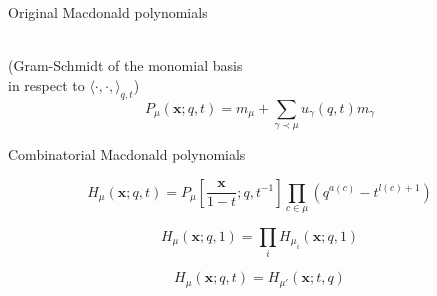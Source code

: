 \documentclass[12pt]{amsart}
\begin{document}
\vspace{-10pt}
\begin{mdframed}[linecolor=red!20,linewidth=3pt,innertopmargin=8pt]
	\begin{minipage}[t]{9cm}
		\begin{bf}Original Macdonald polynomials\end{bf}
		\\(Gram-Schmidt of the monomial basis
		\\in respect to $\langle \cdot,\cdot,\rangle_{q,t}$)
		\begin{equation}P_\mu(\bm{x};q,t)=m_\mu+\sum_{\gamma\prec \mu}u_\gamma(q,t)m_\gamma
		\end{equation}
	\end{minipage}
	\begin{minipage}[t]{10cm}
		\begin{bf}Combinatorial Macdonald polynomials\end{bf}

		\begin{equation}H_\mu(\bm{x};q,t)=P_\mu\left[\frac{\bm{x}}{1-t};q,t^{-1}\right]\underset{c\in \mu}{\prod} (q^{a(c)}-t^{l(c)+1})
		\end{equation}
	\end{minipage}

	\begin{minipage}[t]{9cm}
		\begin{bf}\end{bf}
		\begin{equation}H_{\mu}(\bm{x};q,1)=\prod_i H_{\mu_i}(\bm{x};q,1)
		\end{equation}
	\end{minipage}
	\begin{minipage}[t]{10cm}
		\begin{bf}\end{bf}
		\begin{equation}H_\mu(\bm{x};q,t)=H_{\mu'}(\bm{x};t,q) 
	\end{equation}
	\end{minipage}



\end{mdframed}
\end{document}
